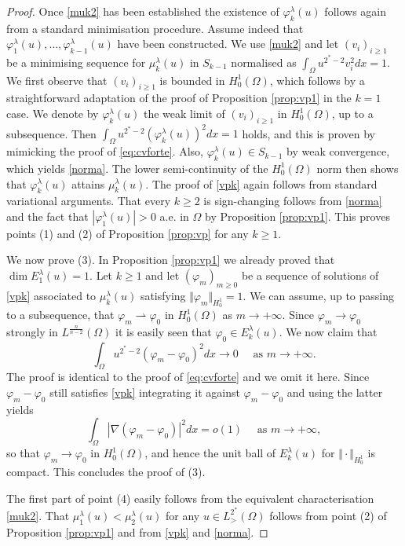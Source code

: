\documentclass[10pt]{amsart}
\numberwithin{equation}{section}
\newcommand{\vp}{\varphi}
\newcommand{\Om}{\Omega}
\newcommand{\mkl}{\mu_{k}^{\lambda}}
\newcommand{\vkl}{\varphi_{k}^{\lambda}}
\theoremstyle{plain}
\theoremstyle{remark}
\begin{document}
\begin{proof}
Once \eqref{muk2} has been established the existence of $\vkl(u)$ follows again from a standard minimisation procedure. Assume indeed that $\vp_1^{\lambda}(u), \dots, \vp_{k-1}^{\lambda}(u)$ have been constructed. We use \eqref{muk2} and let $(v_i)_{i \ge1}$ be a minimising sequence for $\mu_k^{\lambda}(u)$ in $S_{k-1}$ normalised as $\int_{\Om} u^{2^*-2}v_i^2dx = 1$. We first observe that $(v_i)_{i\ge1}$ is bounded in $H^1_0(\Om)$, which follows by a straightforward adaptation of the proof of Proposition \ref{prop:vp1} in the $k=1$ case. We denote by $\vp_k^{\lambda}(u)$ the weak limit of $(v_i)_{i\ge1}$ in $H^1_0(\Om)$, up to a subsequence. Then $\int_{\Om} u^{2^*-2} (\vp_k^{\lambda}(u))^2dx = 1$ holds, and this is proven by mimicking the proof of \eqref{eq:cvforte}. Also, $\vp_k^{\lambda}(u) \in S_{k-1}$ by weak convergence, which yields \eqref{norma}. The lower semi-continuity of the $H^1_0(\Om)$ norm then shows that $\vp_k^{\lambda}(u)$ attains $\mu_k^{\lambda}(u)$. The proof of \eqref{vpk} again follows from standard variational arguments. That every $k \ge 2$ is sign-changing follows from \eqref{norma} and the fact that $|\vp_{1}^\lambda(u)| >0$ a.e. in $\Om$ by Proposition \ref{prop:vp1}. This proves points (1) and (2) of Proposition \ref{prop:vp} for any $k\ge1$. 


\medskip

We now prove (3). In Proposition \ref{prop:vp1} we already proved that $\dim E_1^\lambda(u) = 1$. Let $k \ge 1$ and let $(\vp_m)_{m \ge0}$ be a sequence of solutions of \eqref{vpk} associated to $\mkl(u)$ satisfying $\Vert \vp_m \Vert_{H^1_0} = 1$. We can assume, up to passing to a subsequence, that $\vp_m \rightharpoonup \vp_0$ in $H^1_0(\Om)$ as $m \to + \infty$. Since $\vp_m \to \vp_0$ strongly in $L^{\frac{n}{n-2}}(\Om)$ it is easily seen that $\vp_0 \in E_k^{\lambda}(u)$. We now claim that
\begin{equation*} 
\int_{\Om} u^{2^*-2}(\vp_m - \vp_0)^2dx \to 0 \quad \text{ as } m \to + \infty. 
\end{equation*}
The proof is identical to the proof of \eqref{eq:cvforte} and we omit it here. Since $\vp_m-\vp_0$ still satisfies \eqref{vpk} integrating it against $\vp_m-\vp_0$ and using the latter yields
$$ \int_{\Om} |\nabla (\vp_m - \vp_0)|^2dx = o(1) \quad \text{ as } m \to + \infty, $$
so that $\vp_m \to \vp_0$ in $H^1_0(\Om)$, and hence the unit ball of $E_k^{\lambda}(u)$ for $\Vert \cdot \Vert_{H^1_0}$ is compact. This concludes the proof of (3).

The first part of point (4) easily follows from the equivalent characterisation \eqref{muk2}. That $ \mu_1^{\lambda}(u) < \mu_{2}^{\lambda}(u)$ for any $u \in L^{2^*}_{>}(\Om)$ follows from  point (2) of Proposition \ref{prop:vp1} and from \eqref{vpk} and \eqref{norma}. 


\end{proof}
\end{document}
